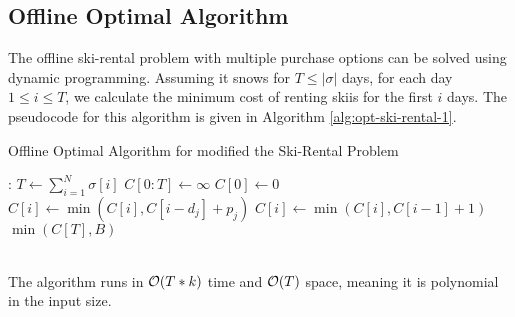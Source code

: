 \documentclass[11pt]{article}
\newcommand{\bigO}{{\cal O}}
\begin{document}
\subsection*{Offline Optimal Algorithm}
The offline ski-rental problem with multiple purchase options can be solved using dynamic programming. Assuming it snows
for $T \leq |\sigma|$ days, for each day $1 \leq i \leq T$, we calculate the minimum cost of renting skiis for the
first $i$ days. The pseudocode for this algorithm is given in Algorithm \ref{alg:opt-ski-rental-1}.
\begin{algorithm}
    \caption{Offline Optimal Algorithm for modified the Ski-Rental Problem}
    \label{alg:opt-ski-rental-1}
    \begin{algorithmic}[1]
        :
            \State $T \gets \sum_{i=1}^{N}\sigma[i]$ 
            \State $C[0:T] \gets \infty$
            \State $C[0] \gets 0$
                    \State $C[i] \gets \min{(C[i], C[i - d_{j}] + p_{j})}$
                \EndFor
                \State $C[i] \gets \min{(C[i], C[i - 1] + 1)}$ 
            \EndFor
            \State \Return $\min{(C[T], B)}$
        \EndProcedure
    \end{algorithmic}
\end{algorithm}
\vspace*{0pt} \\
The algorithm runs in $\bigO(T*k)$ time and $\bigO(T)$ space, meaning it is polynomial in the input size.
\end{document}
